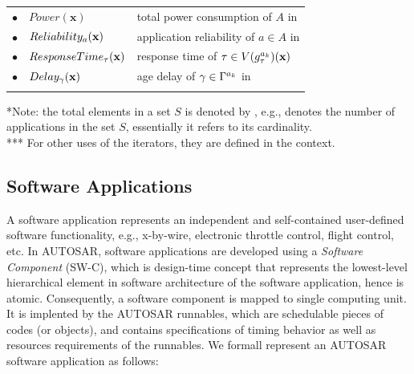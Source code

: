 \begin{longtable}{@{}llp{}@{}}
$\bullet$ & $Power(\textbf{x})$                		& total power consumption of  $A$ in \ttx    \\
$\bullet$ & $Reliability_{a}(\textbf{x})$      					& application reliability  of $a\in A$ in \ttx              \\
$\bullet$ & $ResponseTime_{\tau}(\textbf{x})$     		& response time of  $\tau \in V(\sss{g}[k][\tau])(\x)$                       \\
$\bullet$ & $Delay_\gamma(\textbf{x})$            			& age delay of $\gamma \in \ssp{\Gamma} $   in \ttx     \\
\bottomrule\\
\end{longtable}
{\footnotesize 
	*Note: the total elements in a set $S$ is denoted by , e.g.,  denotes the number of applications in the set $S$, essentially it refers to its cardinality.\\
   *** For other uses of the iterators, they are defined in the context.}

\subsection{Software Applications}
A software application represents an independent and self-contained user-defined software functionality, e.g., x-by-wire, electronic throttle control, flight control, etc. In AUTOSAR, software applications are developed using a \textit{Software Component} (SW-C), which is design-time concept that represents the lowest-level hierarchical element in software architecture of the software application, hence is atomic. Consequently, a software component is mapped to single computing unit. It is implented by the AUTOSAR runnables, which are schedulable pieces of codes (or objects), and contains specifications of timing behavior as well as resources requirements of the runnables. We formall represent an AUTOSAR software application as follows:

